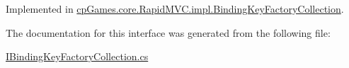 Implemented in \mbox{\hyperlink{classcp_games_1_1core_1_1_rapid_m_v_c_1_1impl_1_1_binding_key_factory_collection_a63ede48e3fa4b488ca0537e37fe3e086}{cp\+Games.\+core.\+Rapid\+M\+V\+C.\+impl.\+Binding\+Key\+Factory\+Collection}}.



The documentation for this interface was generated from the following file\+:\begin{DoxyCompactItemize}
\item 
\mbox{\hyperlink{_i_binding_key_factory_collection_8cs}{I\+Binding\+Key\+Factory\+Collection.\+cs}}\end{DoxyCompactItemize}
